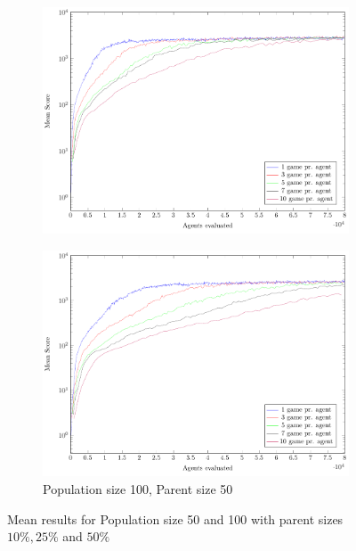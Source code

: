 \begin{figure}
\begin{subfigure}[b]{0.49\textwidth}
        \includegraphics[width=\textwidth]{data/ce_population_offspring/100x_split/constant_l100_o25/mean/PlotFile.pdf}
    \end{subfigure}
    \begin{subfigure}[b]{0.49\textwidth}
    	\caption{Population size 100, Parent size 50}
        \includegraphics[width=\textwidth]{data/ce_population_offspring/100x_split/constant_l100_o50/mean/PlotFile.pdf}
    \end{subfigure}
    
    \caption{Mean results for Population size 50 and 100 with parent sizes $10 \% , 25 \%$ and $50 \%$}
\end{figure}

\clearpage

